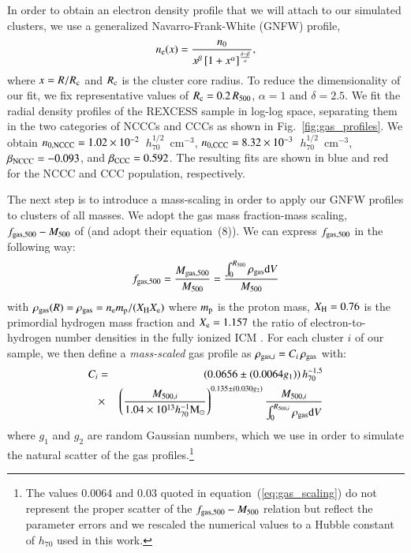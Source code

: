 \documentclass[useAMS,usenatbib]{mn2e}
\begin{document}
In order to obtain an electron density profile that we will attach to our
simulated clusters, we use a generalized Navarro-Frank-White (GNFW) profile,
\begin{equation}
n_{{\mathrm{e}}}(x) = \frac{n_{0}}{x^{\beta}\left[1+x^{\alpha}\right]^{\frac{\delta-\beta}{\alpha}}},
\label{eq:gnfw}
\end{equation}
where $x=R/R_{{\mathrm{c}}}$ and $R_{{\mathrm{c}}}$ is the cluster core radius. To reduce
the dimensionality of our fit, we fix representative values of $R_{{\mathrm{c}}} =
0.2\, R_{500}$, $\alpha = 1$ and $\delta = 2.5$. We fit the radial density
profiles of the REXCESS sample in log-log space, separating them in the two
categories of NCCCs and CCCs as shown in Fig.~\ref{fig:gas_profiles}.  We
obtain $n_{{\mathrm{0,NCCC}}} = 1.02\times10^{-2}$~$h_{70}^{1/2}$~cm$^{-3}$,
$n_{{\mathrm{0,CCC}}} = 8.32\times10^{-3}$~$h_{70}^{1/2}$~cm$^{-3}$,
$\beta_{{\mathrm{NCCC}}} = -0.093$, and $\beta_{{\mathrm{CCC}}} = 0.592$. The resulting
fits are shown in blue and red for the NCCC and CCC population, respectively.

The next step is to introduce a mass-scaling in order to apply our GNFW profiles
to clusters of all masses. We adopt the gas mass fraction-mass scaling,
$f_{{\mathrm{gas}},500}-M_{500}$ of \cite{2009ApJ...693.1142S} (and adopt their
equation~(8)). We can express $f_{{\mathrm{gas}},500}$ in the following way:
\begin{equation}
f_{{\mathrm{gas}},500} = \frac{M_{{\mathrm{gas}},500}}{M_{500}}  = \frac{\int_{0}^{R_{500}} \rho_{{\mathrm{gas}}} {\mathrm{d}}V}{M_{500}}
\label{eq:m500}
\end{equation}
with $\rho_{{\mathrm{gas}}}(R) = \rho_{{\mathrm{gas}}} = n_{{\mathrm{e}}} m_{{\mathrm{p}}} / ( X_{{\mathrm{H}}}X_{{\mathrm{e}}} )$ where
$m_{{\mathrm{p}}}$ is the proton mass, $X_{{\mathrm{H}}} = 0.76$ is the primordial hydrogen
mass fraction and $X_{{\mathrm{e}}} = 1.157$ the ratio of electron-to-hydrogen number
densities in the fully ionized ICM \citep{1988xrec.book.....S}. For each cluster
$i$ of our sample, we then define a \emph{mass-scaled} gas profile as
$\rho_{{\mathrm{gas}},i}=C_{i} \,\rho_{{\mathrm{gas}}}$ with:
\begin{eqnarray}
C_{i}  & = &  (0.0656\pm(0.0064g_{1})) \, h_{70}^{-1.5}  \nonumber \\
 & \times & \left(\frac{M_{500,i}}{1.04 \times 10^{13} h_{70}^{-1} {\mathrm{M_{\odot}}}}\right)^{0.135\pm(0.030g_{2})} \frac{M_{500,i}}{\int_{0}^{R_{500,i}} \rho_{{\mathrm{gas}}} {\mathrm{d}}V}
\label{eq:gas_scaling}
\end{eqnarray}
where $g_{1}$ and $g_{2}$ are random Gaussian numbers, which we use in order to
simulate the natural scatter of the gas profiles.\footnote{The values
  $0.0064$ and $0.03$ quoted in equation~(\ref{eq:gas_scaling}) do not represent
  the proper scatter of the $f_{{\mathrm{gas}},500}-M_{500}$ relation but reflect the
  parameter errors and we rescaled the numerical values to a Hubble constant of
  $h_{70}$ used in this work.}
\end{document}
